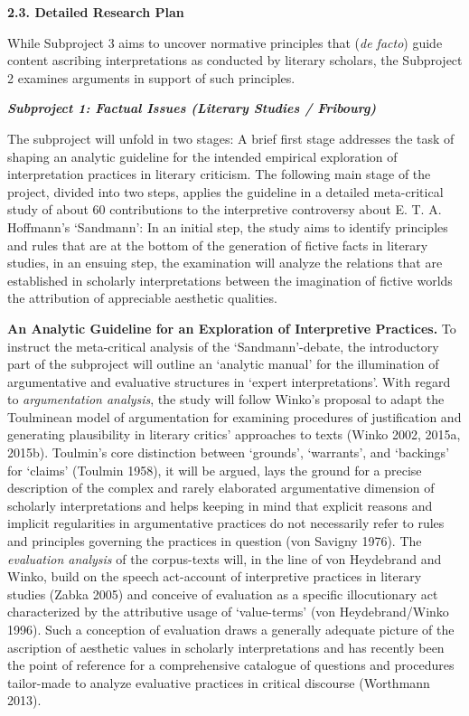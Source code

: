 \noindent\textbf{\large 2.3. Detailed Research Plan}

\noindent While Subproject 3 aims to uncover normative principles that
(\emph{de facto}) guide content ascribing interpretations as conducted
by literary scholars, the Subproject 2 examines arguments in
support of such principles.


\vspace{.2cm}
\noindent\textbf{\emph{Subproject 1: Factual Issues (Literary Studies / Fribourg)}}
\vspace{.1cm}

The subproject will unfold in two stages: A brief first stage addresses the task of shaping an analytic guideline for the intended empirical exploration of interpretation practices in literary criticism. The following main stage of the project, divided into two steps, applies the guideline in a detailed meta-critical study of about 60 contributions to the interpretive controversy about E. T. A. Hoffmann's `Sandmann': In an initial step, the study aims to identify principles and rules that
are at the bottom of the generation of fictive facts in literary studies, in an ensuing step, the examination will analyze the relations that are established in scholarly interpretations between the imagination of fictive worlds the attribution of appreciable aesthetic qualities.

\vspace{.2cm}
\noindent\textbf{An Analytic Guideline for an Exploration of Interpretive Practices.} To instruct  the meta-critical analysis of the `Sandmann'-debate, the introductory part of the subproject will outline an `analytic manual' for the illumination of argumentative and evaluative structures in `expert interpretations'. With regard to \emph{argumentation analysis}, the study will follow Winko's proposal to adapt the Toulminean model of argumentation for examining procedures of justification and generating plausibility in literary critics' approaches to texts (Winko 2002, 2015a, 2015b). Toulmin's core distinction between `grounds', `warrants', and `backings' for `claims' (Toulmin 1958), it will be argued, lays the ground for a precise description of the complex and rarely elaborated argumentative dimension of scholarly interpretations and helps keeping in mind that explicit reasons and implicit regularities in argumentative practices do not necessarily refer to rules and principles governing the practices in question (von Savigny 1976). The \emph{evaluation analysis} of the corpus-texts will, in the line of von Heydebrand and Winko, build on the speech act-account of interpretive practices in literary studies (Zabka 2005) and conceive of evaluation as a specific illocutionary act characterized by the attributive usage of `value-terms' (von Heydebrand/Winko 1996). Such a conception of evaluation draws a generally adequate picture of the ascription of aesthetic values in scholarly interpretations and has recently been the point of reference for a comprehensive catalogue of questions and procedures tailor-made to analyze evaluative practices in critical discourse (Worthmann 2013).

